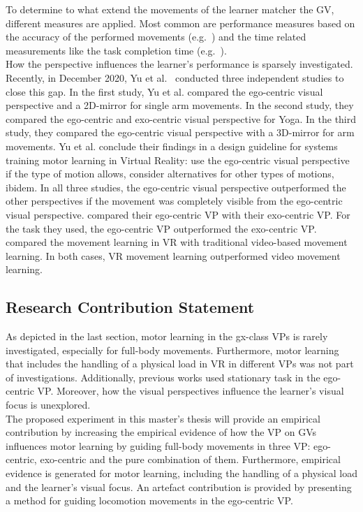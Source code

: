 To determine to what extend the movements of the learner matcher the GV, different measures are applied. Most common are performance measures based on the accuracy of the performed movements (e.g.~\cite{YouMove,thaichichua,vrdancetrainer,onebody,lightguide,physioathome}) and the time related measurements like the task completion time (e.g.~\cite{lightguide,onebody}).\\
How the perspective influences the learner's performance is sparsely investigated. Recently, in December 2020, Yu et al.~\cite{perspectivematters} conducted three independent studies to close this gap. In the first study, Yu et al. compared the ego-centric visual perspective and a 2D-mirror for single arm movements. In the second study, they compared the ego-centric and exo-centric visual perspective for Yoga. In the third study, they compared the ego-centric visual perspective with a 3D-mirror for arm movements. Yu et al. conclude their findings in a design guideline for systems training motor learning in Virtual Reality: use the ego-centric visual perspective if the type of motion allows, consider alternatives for other types of motions, ibidem. In all three studies, the ego-centric visual perspective outperformed the other perspectives if the movement was completely visible from the ego-centric visual perspective. \cite{onebody,lightguide} compared their ego-centric VP with their exo-centric VP. For the task they used, the ego-centric VP outperformed the exo-centric VP. \cite{YouMove,vrdancetrainer} compared the movement learning in VR with traditional video-based movement learning. In both cases, VR movement learning outperformed video movement learning.\\

\subsection{Research Contribution Statement}
\label{sec:delimination_contribution}
As depicted in the last section, motor learning in the gx-class VPs is rarely investigated, especially for full-body movements. Furthermore, motor learning that includes the handling of a physical load in VR in different VPs was not part of investigations. Additionally, previous works used stationary task in the ego-centric VP. Moreover, how the visual perspectives influence the learner's visual focus is unexplored.\\
The proposed experiment in this master's thesis will provide an empirical contribution by increasing the empirical evidence of how the VP on GVs influences motor learning by guiding full-body movements in three VP: ego-centric, exo-centric and the pure combination of them. Furthermore, empirical evidence is generated for motor learning, including the handling of a physical load and the learner's visual focus. An artefact contribution is provided by presenting a method for guiding locomotion movements in the ego-centric VP. \\

